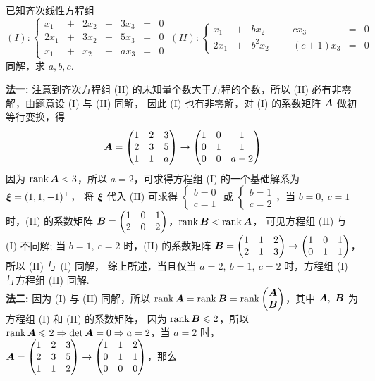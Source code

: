 \begin{example}[2015 华南理工大学]
    已知齐次线性方程组
    $$(I):\left\{\begin{matrix}
            x_1  & + & 2x_2 & + & 3x_3 & = & 0 \\
            2x_1 & + & 3x_2 & + & 5x_3 & = & 0 \\
            x_1  & + & x_2  & + & ax_3 & = & 0
        \end{matrix}\right.~ (II):\left\{\begin{matrix}
            x_1  & + & bx_2   & + & cx_3     & = & 0 \\
            2x_1 & + & b^2x_2 & + & (c+1)x_3 & = & 0
        \end{matrix}\right.$$同解，求 $a,b,c$.
\end{example}
\begin{solution}
    \textbf{法一: }注意到齐次方程组 (II) 的未知量个数大于方程的个数，所以 (II) 必有非零解，由题意设 (I) 与 (II) 同解，
    因此 (I) 也有非零解，对 (I) 的系数矩阵 $\vb*{A}$ 做初等行变换，得
    $$\vb*{A}=\mqty(1&2&3\\2&3&5\\1&1&a)\to\mqty(1&0&1\\0&1&1\\0&0&a-2)$$
    因为 $\rank\vb*{A}<3$，所以 $a=2$，可求得方程组 (I) 的一个基础解系为 $\vb*{\xi}=(1,1,-1)^\top$，
    将 $\vb*{\xi}$ 代入 (II) 可求得 $\begin{cases}
            b=0 \\c=1
        \end{cases}$ 或 $\begin{cases}
            b=1 \\c=2
        \end{cases}$，当 $b=0,~c=1$ 时，(II) 的系数矩阵 $\vb*{B}=\mqty(1&0&1\\2&0&2)$，$\rank\vb*{B}<\rank\vb*{A}$，
    可见方程组 (II) 与 (I) 不同解;
    当 $b=1,~c=2$ 时，(II) 的系数矩阵 $\vb*{B}=\mqty(1&1&2\\2&1&3)\to\mqty(1&0&1\\0&1&1)$，所以 (II) 与 (I) 同解，
    综上所述，当且仅当 $a=2,~b=1,~c=2$ 时，方程组 (I) 与方程组 (II) 同解.\\
    \textbf{法二: }因为 (I) 与 (II) 同解，所以 $\rank\vb*{A}=\rank\vb*{B}=\rank\mqty(\vb*{A}\\\vb*{B})$，其中 $\vb*{A},~\vb*{B}$ 为方程组 (I) 和 (II) 的系数矩阵，
    因为 $\rank\vb*{B}\leqslant 2$，所以 $\rank\vb*{A}\leqslant 2\Rightarrow \det\vb*{A}=0\Rightarrow a=2$，当 $a=2$ 时，$\vb*{A}=\mqty(1&2&3\\2&3&5\\1&1&2)\to\mqty(1&1&2\\0&1&1\\0&0&0)$，那么

\end{solution}
